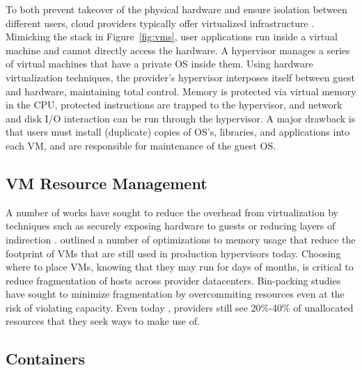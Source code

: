 To both prevent takeover of the physical hardware and ensure isolation between different users, cloud providers typically offer virtualized infrastructure \cite{xen}.
Mimicking the stack in Figure~\ref{fig:vms}, user applications run inside a virtual machine and cannot directly access the hardware.
A hypervisor manages a series of virtual machines that have a private OS inside them.
Using hardware virtualization techniques, the provider's hypervisor interposes itself between guest and hardware, maintaining total control.
Memory is protected via virtual memory in the CPU, protected instructions are trapped to the hypervisor, and network and disk I/O interaction can be run through the hypervisor.
A major drawback is that users must install (duplicate) copies of OS's, libraries, and applications into each VM, and are responsible for maintenance of the guest OS.


\subsection{VM Resource Management}

A number of works have sought to reduce the overhead from virtualization by techniques such as securely exposing hardware to guests \cite{dong2008sr} or reducing layers of indirection \cite{ben2010turtles}.
\cite{waldspurger2002memory} outlined a number of optimizations to memory usage that reduce the footprint of VMs that are still used in production hypervisors today.
Choosing where to place VMs, knowing that they may run for days of months, is critical to reduce fragmentation of hosts across provider datacenters.
Bin-packing studies have sought to minimize fragmentation \cite{binpacking} by overcommiting resources even at the risk of violating capacity.
Even today \cite{fuerst2022memory}, providers still see 20\%-40\% of unallocated resources that they seek ways to make use of.

\subsection{Containers}


